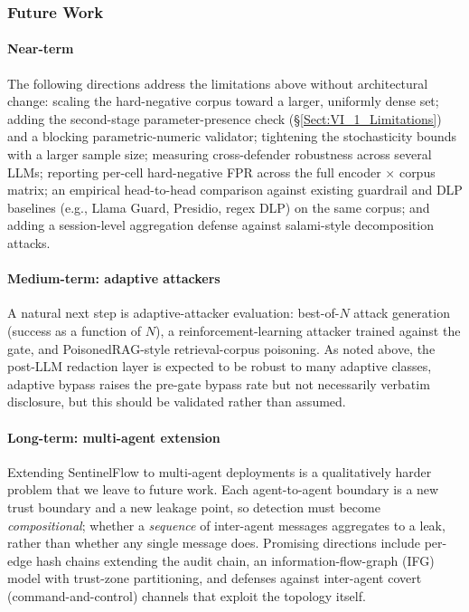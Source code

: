 \documentclass[journal]{IEEEtran}
\begin{document}
\subsubsection{Future Work}
\label{Sect:VI_2_FutureWork}

\paragraph{Near-term}
The following directions address the limitations above without architectural change: scaling the hard-negative corpus toward a larger, uniformly dense set; adding the second-stage parameter-presence check (\S\ref{Sect:VI_1_Limitations}) and a blocking parametric-numeric validator; tightening the stochasticity bounds with a larger sample size; measuring cross-defender robustness across several LLMs; reporting per-cell hard-negative FPR across the full encoder $\times$ corpus matrix; an empirical head-to-head comparison against existing guardrail and DLP baselines (e.g., Llama Guard, Presidio, regex DLP) on the same corpus; and adding a session-level aggregation defense against salami-style decomposition attacks.

\paragraph{Medium-term: adaptive attackers}
A natural next step is adaptive-attacker evaluation: best-of-$N$ attack generation (success as a function of $N$), a reinforcement-learning attacker trained against the gate, and PoisonedRAG-style retrieval-corpus poisoning. As noted above, the post-LLM redaction layer is expected to be robust to many adaptive classes, adaptive bypass raises the pre-gate bypass rate but not necessarily verbatim disclosure, but this should be validated rather than assumed.

\paragraph{Long-term: multi-agent extension}
Extending SentinelFlow to multi-agent deployments is a qualitatively harder problem that we leave to future work. Each agent-to-agent boundary is a new trust boundary and a new leakage point, so detection must become \emph{compositional}; whether a \emph{sequence} of inter-agent messages aggregates to a leak, rather than whether any single message does. Promising directions include per-edge hash chains extending the audit chain, an information-flow-graph (IFG) model with trust-zone partitioning, and defenses against inter-agent covert (command-and-control) channels that exploit the topology itself.
\end{document}
